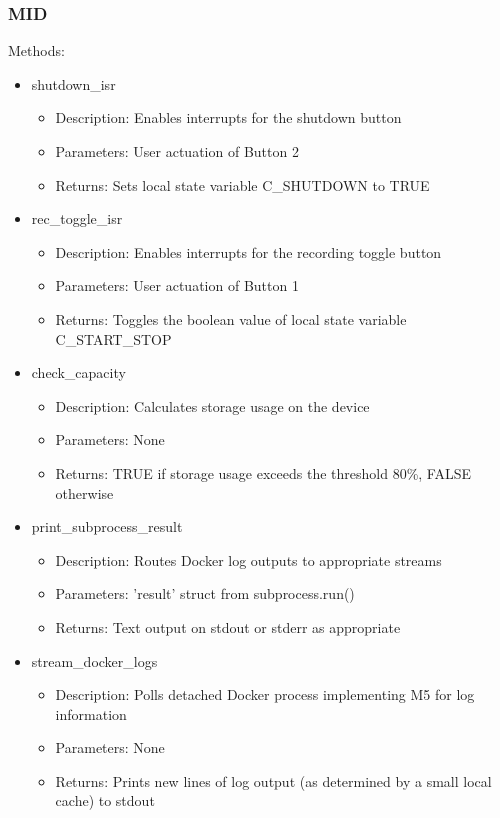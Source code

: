 \documentclass[11pt]{article}
\begin{document}
			\subsubsection{MID}
			Methods:
			\begin{itemize}
				\item shutdown\_isr
					\begin{itemize}
						\item Description: Enables interrupts for the shutdown button
						\item Parameters: User actuation of Button 2
						\item Returns: Sets local state variable C\_SHUTDOWN to TRUE
					\end{itemize}
				\item rec\_toggle\_isr
					\begin{itemize}
						\item Description: Enables interrupts for the recording toggle button
						\item Parameters: User actuation of Button 1
						\item Returns: Toggles the boolean value of local state variable C\_START\_STOP
					\end{itemize}
                \item check\_capacity
					\begin{itemize}
						\item Description: Calculates storage usage on the device
						\item Parameters: None
						\item Returns: TRUE if storage usage exceeds the threshold 80\%, FALSE otherwise
					\end{itemize}
				\item print\_subprocess\_result
					\begin{itemize}
						\item Description: Routes Docker log outputs to appropriate streams
						\item Parameters: 'result' struct from subprocess.run()
						\item Returns: Text output on stdout or stderr as appropriate
					\end{itemize}
                \item stream\_docker\_logs
					\begin{itemize}
						\item Description: Polls detached Docker process implementing M5 for log information
						\item Parameters: None
						\item Returns: Prints new lines of log output (as determined by a small local cache) to stdout
					\end{itemize}
			\end{itemize}
\end{document}
